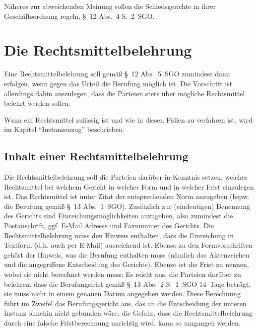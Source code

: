 Näheres zur abweichenden Meinung sollen die Schiedsgerichte in ihrer Geschäftsordnung regeln, \S~12 Abs.~4 S.~2~SGO.

\section{Die Rechtsmittelbelehrung}
\label{Urteilsaufbau:Rechtsmittelbelehrung}
Eine Rechtsmittelbelehrung soll gemäß \S~12 Abs.~5~SGO zumindest dann erfolgen, wenn gegen das Urteil die Berufung möglich ist.
Die Vorschrift ist allerdings dahin auszulegen, dass die Parteien stets über mögliche Rechtsmittel belehrt werden sollen.

Wann ein Rechtsmittel zulässig ist und wie in diesen Fällen zu verfahren ist, wird im Kapitel \enquote{Instanzenzug} beschrieben.

\subsection{Inhalt einer Rechtsmittelbelehrung}
\label{Urteilsaufbau:Rechtsmittelbelehrung:Inhalt}
Die Rechtsmittelbelehrung soll die Parteien darüber in Kenntnis setzen, welches Rechtsmittel bei welchem Gericht in welcher Form und in welcher Frist einzulegen ist.
Das Rechtsmittel ist unter Zitat der entsprechenden Norm anzugeben (bspw. die Berufung gemäß \S~13 Abs.~1~SGO).
Zusätzlich zur (eindeutigen) Benennung des Gerichts sind Einreichungsmöglichkeiten anzugeben, also zumindest die Postanschrift, ggf. E-Mail Adresse und Faxnummer des Gerichts.
Die Rechtsmittelbelehrung muss den Hinweis enthalten, dass die Einreichung in Textform (d.h. auch per E-Mail) ausreichend ist.
Ebenso zu den Formvorschriften gehört der Hinweis, was die Berufung enthalten muss (nämlich das Aktenzeichen und die angegriffene Entscheidung des Gerichts).
Ebenso ist die Frist zu nennen, wobei sie nicht berechnet werden muss:
Es reicht aus, die Parteien darüber zu belehren, dass die Berufungsfrist gemäß \S~13 Abs.~2 S.~1~SGO 14~Tage beträgt, sie muss nicht in einem genauen Datum angegeben werden.
Diese Berechnung führt im Zweifel das Berufungsgericht aus, das an die Entscheidung der unteren Instanz ohnehin nicht gebunden wäre; die Gefahr, dass die Rechtsmittelbelehrung durch eine falsche Fristberechnung unrichtig wird, kann so umgangen werden.

